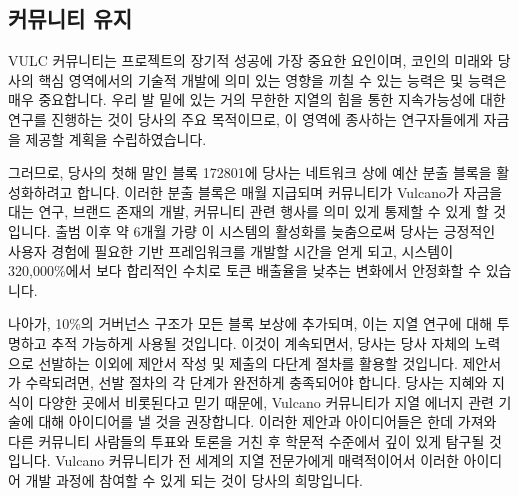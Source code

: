\documentclass[A4paper, 12pt]{article}
\begin{document}
\subsection{커뮤니티 유지}
VULC 커뮤니티는 프로젝트의 장기적 성공에 가장 중요한 요인이며, 코인의 미래와 당사의 핵심 영역에서의 기술적 개발에 의미 있는 영향을 끼칠 수 있는 능력은  및 능력은 매우 중요합니다. 우리 발 밑에 있는 거의 무한한 지열의 힘을 통한 지속가능성에 대한 연구를 진행하는 것이 당사의 주요 목적이므로, 이 영역에 종사하는 연구자들에게 자금을 제공할 계획을 수립하였습니다.

그러므로, 당사의 첫해 말인 블록 172801에 당사는 네트워크 상에 예산 분출 블록을 활성화하려고 합니다. 이러한 분출 블록은 매월 지급되며 커뮤니티가 Vulcano가 자금을 대는 연구, 브랜드 존재의 개발, 커뮤니티 관련 행사를 의미 있게 통제할 수 있게 할 것입니다. 출범 이후 약 6개월 가량 이 시스템의 활성화를 늦춤으로써 당사는 긍정적인 사용자 경험에 필요한 기반 프레임워크를 개발할 시간을 얻게 되고, 시스템이 320,000\%에서 보다 합리적인 수치로 토큰 배출율을 낮추는 변화에서 안정화할 수 있습니다.

나아가, 10\%의 거버넌스 구조가 모든 블록 보상에 추가되며, 이는 지열 연구에 대해 투명하고 추적 가능하게 사용될 것입니다. 이것이 계속되면서, 당사는 당사 자체의 노력으로 선발하는 이외에 제안서 작성 및 제출의 다단계 절차를 활용할 것입니다. 제안서가 수락되려면, 선발 절차의 각 단계가 완전하게 충족되어야 합니다. 당사는 지혜와 지식이 다양한 곳에서 비롯된다고 믿기 때문에, Vulcano 커뮤니티가 지열 에너지 관련 기술에 대해 아이디어를 낼 것을 권장합니다.  이러한 제안과 아이디어들은 한데 가져와 다른 커뮤니티 사람들의 투표와 토론을 거친 후 학문적 수준에서 깊이 있게 탐구될 것입니다. Vulcano 커뮤니티가 전 세계의 지열 전문가에게 매력적이어서 이러한 아이디어 개발 과정에 참여할 수 있게 되는 것이 당사의 희망입니다.
\end{document}
